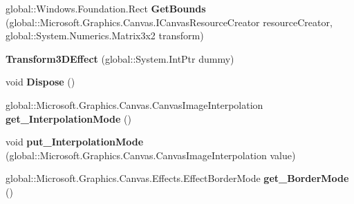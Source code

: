 \begin{DoxyCompactItemize}
\item 
\mbox{\label{class_microsoft_1_1_graphics_1_1_canvas_1_1_effects_1_1_transform3_d_effect_a9e9d12b267f452ee3aa3b6b19363d355}} 
global\+::\+Windows.\+Foundation.\+Rect {\bfseries Get\+Bounds} (global\+::\+Microsoft.\+Graphics.\+Canvas.\+I\+Canvas\+Resource\+Creator resource\+Creator, global\+::\+System.\+Numerics.\+Matrix3x2 transform)
\item 
\mbox{\label{class_microsoft_1_1_graphics_1_1_canvas_1_1_effects_1_1_transform3_d_effect_af7099edb8f0d394bed7b6d387eb4c183}} 
{\bfseries Transform3\+D\+Effect} (global\+::\+System.\+Int\+Ptr dummy)
\item 
\mbox{\label{class_microsoft_1_1_graphics_1_1_canvas_1_1_effects_1_1_transform3_d_effect_a9623fd7e2c02c46327c72133773725c1}} 
void {\bfseries Dispose} ()
\item 
\mbox{\label{class_microsoft_1_1_graphics_1_1_canvas_1_1_effects_1_1_transform3_d_effect_a92c6d9ac604d9adcc898ee36205ad9bd}} 
global\+::\+Microsoft.\+Graphics.\+Canvas.\+Canvas\+Image\+Interpolation {\bfseries get\+\_\+\+Interpolation\+Mode} ()
\item 
\mbox{\label{class_microsoft_1_1_graphics_1_1_canvas_1_1_effects_1_1_transform3_d_effect_a38d32bf836b68f42f30afd88937f6280}} 
void {\bfseries put\+\_\+\+Interpolation\+Mode} (global\+::\+Microsoft.\+Graphics.\+Canvas.\+Canvas\+Image\+Interpolation value)
\item 
\mbox{\label{class_microsoft_1_1_graphics_1_1_canvas_1_1_effects_1_1_transform3_d_effect_ad947ca8fd0e8f553756452097191b3e9}} 
global\+::\+Microsoft.\+Graphics.\+Canvas.\+Effects.\+Effect\+Border\+Mode {\bfseries get\+\_\+\+Border\+Mode} ()
\item 
\mbox{\label{class_microsoft_1_1_graphics_1_1_canvas_1_1_effects_1_1_transform3_d_effect_a8f41e3d39b88ba94f977519171bf2446}} 

\end{DoxyCompactItemize}

